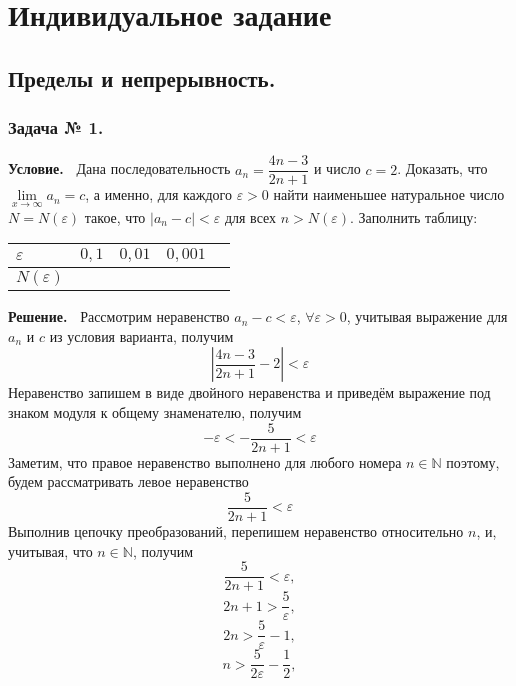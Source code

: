 \documentclass[12pt]{article}
\begin{document}
	\section{Индивидуальное задание}
	\subsection{Пределы и непрерывность.}
	\subsubsection*{\center Задача № 1.}
	{\bf Условие.~}
	Дана последовательность $a_{n}=\dfrac{4n-3}{2n+1}$ и число $c={2} $. Доказать, что $\lim\limits_{x\rightarrow\infty} a_{n}=c $, а именно, для каждого $\varepsilon>0$ найти наименьшее натуральное число  $N{=}N(\varepsilon)$ такое, что $|a_{n}-c|<\varepsilon$ для всех $n>N(\varepsilon)$. Заполнить таблицу: 
	\begin{center}
		\begin{tabular}{ | p{25pt} | c | c | c | c |}
			\hline
			$\varepsilon$& $0{,}1$ & $0{,}01$ & $0{,}001$ \\ \hline
			$N(\varepsilon)$ &   &   &\\
			\hline
		\end{tabular}
	\end{center}
	\medskip
	{\bf Решение.~}
	Рассмотрим неравенство $a_{n}-c<\varepsilon$, $\forall\varepsilon>0$, учитывая выражение для $a_{n}$ и $c$ из условия варианта, получим 
	$$\left|\frac{4n-3}{2n+1}-{2}\right|<\varepsilon$$
	Неравенство запишем в виде двойного неравенства и приведём выражение под знаком модуля к общему знаменателю, получим
	$${-}\varepsilon <{-}\dfrac{5}{2n+1}<\varepsilon$$
	Заметим, что правое неравенство выполнено для любого номера $n\in \mathbb{N}$ поэтому, будем рассматривать левое неравенство
	$$\frac{5}{2n+1}<\varepsilon$$
	Выполнив цепочку преобразований, перепишем неравенство относительно $n$, и, учитывая, что $n\in \mathbb{N}$, получим 
	$$\dfrac{5}{2n+1}<\varepsilon,$$
	$$2n+1>\dfrac{5}{\varepsilon},$$
	$$2n>\dfrac{5}{\varepsilon}-{1},$$
	$$n>\dfrac{5}{2\varepsilon}-\dfrac{1}{2},$$
\end{document}
